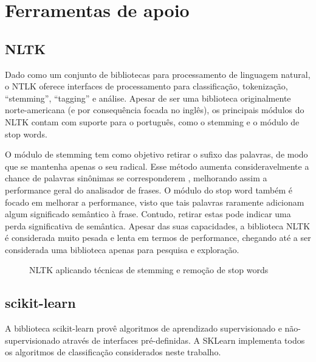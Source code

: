 \chapter[Ferramentas de apoio]{Ferramentas de apoio}

\section{NLTK}

Dado como um conjunto de bibliotecas para processamento de linguagem natural, o NTLK oferece interfaces de processamento para classificação, tokenização, “stemming”, “tagging” e análise. Apesar de ser uma biblioteca originalmente norte-americana (e por consequência focada no inglês), os principais módulos do NLTK contam com suporte para o português, como o stemming e o módulo de stop words.

O módulo de stemming tem como objetivo retirar o sufixo das palavras, de modo que se mantenha apenas o seu radical. Esse método aumenta consideravelmente a chance de palavras sinônimas se corresponderem \cite{marconltk}, melhorando assim a performance geral do analisador de frases. O módulo do stop word também é focado em melhorar a performance, visto que tais palavras raramente adicionam algum significado semântico à frase. Contudo, retirar estas pode indicar uma perda significativa de semântica. Apesar das suas capacidades, a biblioteca NLTK é considerada muito pesada e lenta em termos de performance, chegando até a ser considerada uma biblioteca apenas para pesquisa e exploração.

\begin{figure}[!htb]
    \caption{\label{fig:my-label} NLTK aplicando técnicas de stemming e remoção de stop words}
\end{figure}

\section{scikit-learn}

A biblioteca scikit-learn provê algoritmos de aprendizado supervisionado e não-supervisionado através de interfaces pré-definidas. A SKLearn implementa todos os algoritmos de classificação considerados neste trabalho.

